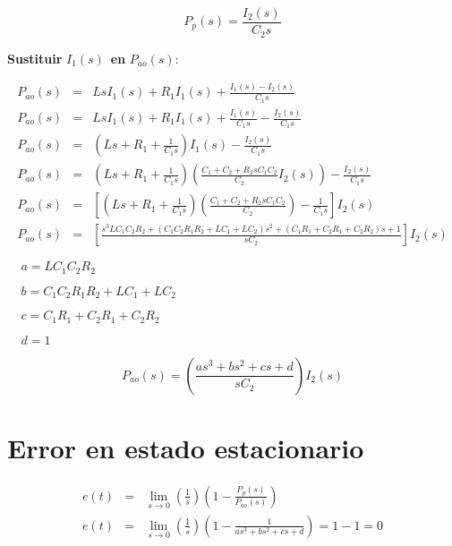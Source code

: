\documentclass[letterpaper,11pt]{article}
\begin{document}
\begin{equation*}
P_{p}\left( s\right) =\frac{I_{2}\left( s\right) }{C_{2}s}
\end{equation*}

\textbf{Sustituir }$I_{1}\left( s\right) $\ \textbf{en} $P_{ao}\left(
s\right) $:

\begin{eqnarray*}
P_{ao}\left( s\right) &=&LsI_{1}\left( s\right) +R_{1}I_{1}\left( s\right) +%
\frac{I_{1}\left( s\right) -I_{2}\left( s\right) }{C_{1}s} \\
P_{ao}\left( s\right) &=&LsI_{1}\left( s\right) +R_{1}I_{1}\left( s\right) +%
\frac{I_{1}\left( s\right) }{C_{1}s}-\frac{I_{2}\left( s\right) }{C_{1}s} \\
P_{ao}\left( s\right) &=&\left( Ls+R_{1}+\frac{1}{C_{1}s}\right) I_{1}\left(
s\right) -\frac{I_{2}\left( s\right) }{C_{1}s} \\
P_{ao}\left( s\right) &=&\left( Ls+R_{1}+\frac{1}{C_{1}s}\right) \left( 
\frac{C_{1}+C_{2}+R_{2}sC_{1}C_{2}}{C_{2}}I_{2}\left( s\right) \right) -%
\frac{I_{2}\left( s\right) }{C_{1}s} \\
P_{ao}\left( s\right) &=&\left[ \left( Ls+R_{1}+\frac{1}{C_{1}s}\right)
\left( \frac{C_{1}+C_{2}+R_{2}sC_{1}C_{2}}{C_{2}}\right) -\frac{1}{C_{1}s}%
\right] I_{2}\left( s\right) \\
P_{ao}\left( s\right) &=&\left[ \frac{s^{3}LC_{1}C_{2}R_{2}+\left(
C_{1}C_{2}R_{1}R_{2}+LC_{1}+LC_{2}\right) s^{2}+\left(
C_{1}R_{1}+C_{2}R_{1}+C_{2}R_{2}\right) s+1}{sC_{2}}\right] I_{2}\left(
s\right)
\end{eqnarray*}

$\ \ \ \ \ a=LC_{1}C_{2}R_{2}$

$\ \ \ \ \ b=C_{1}C_{2}R_{1}R_{2}+LC_{1}+LC_{2}$

$\ \ \ \ \ c=C_{1}R_{1}+C_{2}R_{1}+C_{2}R_{2}$

$\ \ \ \ \ d=1$

\begin{equation*}
P_{ao}\left( s\right) =\left( \frac{as^{3}+bs^{2}+cs+d}{sC_{2}}\right)
I_{2}\left( s\right)
\end{equation*}

\bigskip

\section{Error en estado estacionario}

\begin{eqnarray*}
e\left( t\right) &=&\lim_{s\rightarrow 0}\left( \frac{1}{s}\right) \left( 1-%
\frac{P_{p}\left( s\right) }{P_{ao}\left( s\right) }\right) \\
e\left( t\right) &=&\lim_{s\rightarrow 0}\left( \frac{1}{s}\right) \left( 1-%
\frac{1}{as^{3}+bs^{2}+cs+d}\right) =1-1=0
\end{eqnarray*}
\end{document}
